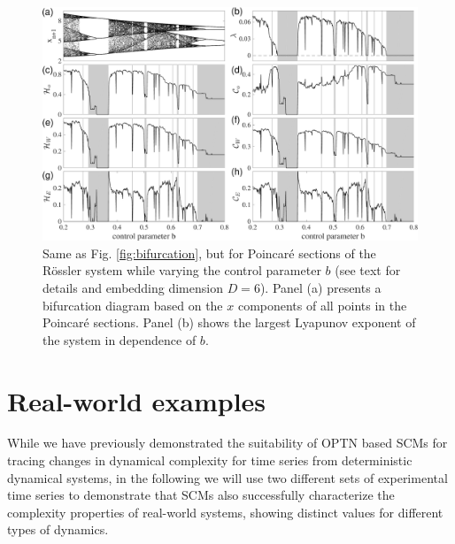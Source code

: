 \documentclass[aip,cha,reprint,nofootinbib]{revtex4-1}
\begin{document}
\begin{figure}
	\centering 
	\includegraphics[width=2\columnwidth]{rosslerEntropy.pdf}
\caption{\small{Same as Fig. \ref{fig:bifurcation}, but for Poincar\'e sections of the R\"ossler system while varying the control parameter $b$ (see text for details {\color{red}and embedding dimension $D = 6$).} Panel (a) presents a bifurcation diagram based on the $x$ components of all points in the Poincar\'e sections. Panel (b) shows the largest Lyapunov exponent of the system in dependence of $b$.} \label{fig:bifurRossler}}
\end{figure}


\section{Real-world examples} \label{sec:time}
While we have previously demonstrated the suitability of OPTN based SCMs for tracing changes in dynamical complexity for time series from deterministic dynamical systems, in the following we will use two different sets of experimental time series to demonstrate that SCMs also successfully characterize the complexity properties of real-world systems, showing distinct values for different types of dynamics. 
\end{document}
